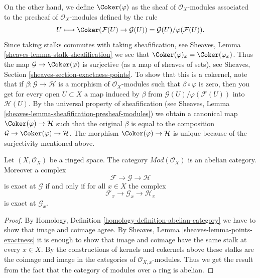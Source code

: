 \medskip\noindent
On the other hand, we define
$\Coker(\varphi)$ as the sheaf of $\mathcal{O}_X$-modules
associated to the presheaf of $\mathcal{O}_X$-modules defined
by the rule
$$
U
\longmapsto
\Coker(\mathcal{F}(U)\to \mathcal{G}(U)) =
\mathcal{G}(U)/\varphi(\mathcal{F}(U)).
$$
Since taking stalks commutes with taking sheafification, see
Sheaves, Lemma \ref{sheaves-lemma-stalk-sheafification} we
see that $\Coker(\varphi)_x = \Coker(\varphi_x)$.
Thus the map $\mathcal{G} \to \Coker(\varphi)$ is surjective
(as a map of sheaves of sets),
see Sheaves, Section \ref{sheaves-section-exactness-points}.
To show that this is a cokernel, note that if
$\beta : \mathcal{G} \to \mathcal{H}$ is a morphism of $\mathcal{O}_X$-modules
such that $\beta \circ \varphi$ is zero, then you get for every
open $U \subset X$ a map induced by $\beta$ from
$\mathcal{G}(U)/\varphi(\mathcal{F}(U))$ into $\mathcal{H}(U)$.
By the universal property of sheafification (see
Sheaves, Lemma \ref{sheaves-lemma-sheafification-presheaf-modules})
we obtain a canonical map $\Coker(\varphi) \to \mathcal{H}$
such that the original $\beta$ is equal to
the composition
$\mathcal{G} \to \Coker(\varphi) \to \mathcal{H}$.
The morphism $\Coker(\varphi) \to \mathcal{H}$ is unique
because of the surjectivity mentioned above.

\begin{lemma}
\label{lemma-abelian}
Let $(X, \mathcal{O}_X)$ be a ringed space. The category
$\textit{Mod}(\mathcal{O}_X)$ is an abelian category. Moreover
a complex
$$
\mathcal{F} \to \mathcal{G} \to \mathcal{H}
$$
is exact at $\mathcal{G}$ if and only if for all $x \in X$ the
complex
$$
\mathcal{F}_x \to \mathcal{G}_x \to \mathcal{H}_x
$$
is exact at $\mathcal{G}_x$.
\end{lemma}

\begin{proof}
By Homology, Definition \ref{homology-definition-abelian-category}
we have to show that image and coimage agree. By Sheaves,
Lemma \ref{sheaves-lemma-points-exactness} it is enough to show
that image and coimage have the same stalk at every $x \in X$.
By the constructions of kernels and cokernels above these stalks
are the coimage and image in the categories of $\mathcal{O}_{X, x}$-modules.
Thus we get the result from the fact that the category of modules
over a ring is abelian.
\end{proof}

